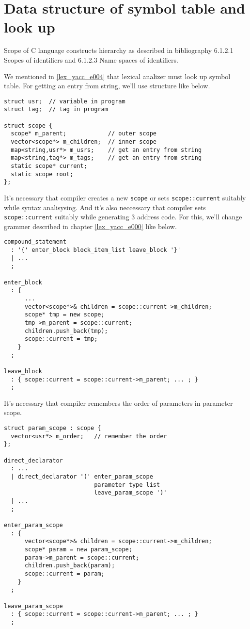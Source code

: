 \label{symtab_e002}

\section{Data structure of symbol table and look up}
Scope of C language constructs hierarchy as described in
bibliography \cite{ISO} 6.1.2.1 Scopes of identifiers and
6.1.2.3 Name spaces of identifiers.

We mentioned in \ref{lex_yacc_e004} that lexical analizer must look up
symbol table. For getting an entry from string, we'll use
structure like below.

\label{symtab_e000}
\begin{verbatim}
struct usr;  // variable in program
struct tag;  // tag in program

struct scope {
  scope* m_parent;            // outer scope
  vector<scope*> m_children;  // inner scope
  map<string,usr*> m_usrs;    // get an entry from string
  map<string,tag*> m_tags;    // get an entry from string
  static scope* current;
  static scope root;
};
\end{verbatim}

It's necessary that compiler creates a new {\tt{scope}} or sets
{\tt{scope::current}} suitably while syntax analisysing.
And it's also neccessary that compiler sets {\tt{scope::current}} suitably
while generating 3 address code.
For this, we'll change grammer described in chapter \ref{lex_yacc_e000}
like below.

\begin{verbatim}
compound_statement
  : '{' enter_block block_item_list leave_block '}'
  | ...
  ;

enter_block
  : {
      ...
      vector<scope*>& children = scope::current->m_children;
      scope* tmp = new scope;
      tmp->m_parent = scope::current;
      children.push_back(tmp);
      scope::current = tmp;
    }
  ;

leave_block
  : { scope::current = scope::current->m_parent; ... ; }
  ;
\end{verbatim}

It's necessary that compiler remembers the order of parameters in
parameter scope.
\begin{verbatim}
struct param_scope : scope {
  vector<usr*> m_order;   // remember the order
};

direct_declarator
  : ...
  | direct_declarator '(' enter_param_scope
                          parameter_type_list
                          leave_param_scope ')'
  | ...
  ;

enter_param_scope
  : {
      vector<scope*>& children = scope::current->m_children;
      scope* param = new param_scope;
      param->m_parent = scope::current;
      children.push_back(param);
      scope::current = param;
    }
  ;

leave_param_scope
  : { scope::current = scope::current->m_parent; ... ; }
  ;
\end{verbatim}

